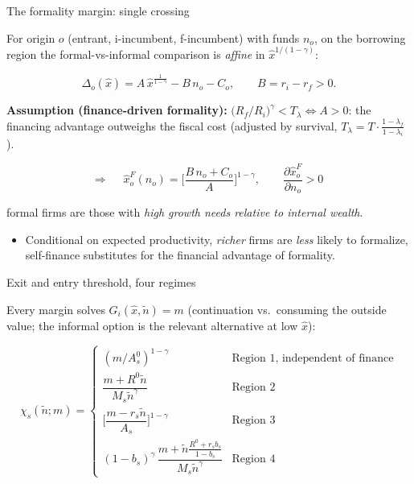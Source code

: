 \documentclass[aspectratio=169]{beamer}
\begin{document}
\begin{frame}[noframenumbering]{The formality margin: single crossing}
\label{formalthresholdcf}
 
For origin $o$ (entrant, i-incumbent, f-incumbent) with funds $n_{o}$, on the borrowing region the formal-vs-informal comparison is \emph{affine} in $\hat x^{1/(1-\gamma)}$:
 
\begin{equation*}
  \Delta_{o}(\hat x)=A\,\hat x^{\frac{1}{1-\gamma}}
  -B\,n_{o}-C_{o},\qquad
  B=r_{i}-r_{f}>0 .
\end{equation*}
 
\textbf{Assumption (finance-driven formality):} $\big(R_{f}/R_{i}\big)^{\gamma}<T_{\lambda} \iff A>0$: the financing advantage outweighs the fiscal cost (adjusted by survival, $T_{\lambda}=T\cdot \tfrac{1-\lambda_{f}}{1-\lambda_{i}}$).
 
\begin{equation*}
  \Rightarrow\quad \boxed{\;\hat x_o^F(n_{o}) =\Big[\frac{B\,n_{o}+C_{o}}{A}\Big]^{1-\gamma},\qquad \frac{\partial\hat x^F_{o}}{\partial n_{o}}>0\;}
\end{equation*}
 
 formal firms are those with \emph{high growth needs relative to internal wealth}.
 
\begin{itemize}
    \item Conditional on expected productivity, \emph{richer} firms are \emph{less} likely to formalize, self-finance substitutes for the financial advantage of formality.
\end{itemize}
 
\hyperlink{threshold}{}
 
\end{frame}
 
 
\begin{frame}[noframenumbering]{Exit and entry threshold, four regimes}
\label{entryexitthresholdcf}
 
Every margin solves $G_{i}(\hat x,\tilde n)=m$
(continuation vs.\ consuming the outside value; the informal option is
the relevant alternative at low $\hat x$):
 
\begin{equation*}
  \chi_{s}(\tilde n;m)=
  \begin{cases}
    (m/A^{0}_{s})^{1-\gamma} & \text{Region 1, independent of finance}\\[2pt]
    \dfrac{m+R^0 \tilde n}{M_{s}\tilde n^{\gamma}}
      & \text{Region 2}\\[6pt]
    \Big[\dfrac{m-r_{s}\tilde n}{A_{s}}\Big]^{1-\gamma}
      & \text{Region 3}\\[6pt]
    (1-b_{s})^{\gamma}\,
    \dfrac{m+\tilde n\frac{R^0 +r_{s}b_{s}}
    {1-b_{s}}}{M_{s}\tilde n^{\gamma}} & \text{Region 4}
  \end{cases}
\end{equation*}
 
\hyperlink{threshold}{}
 
\end{frame}
 
\end{document}
